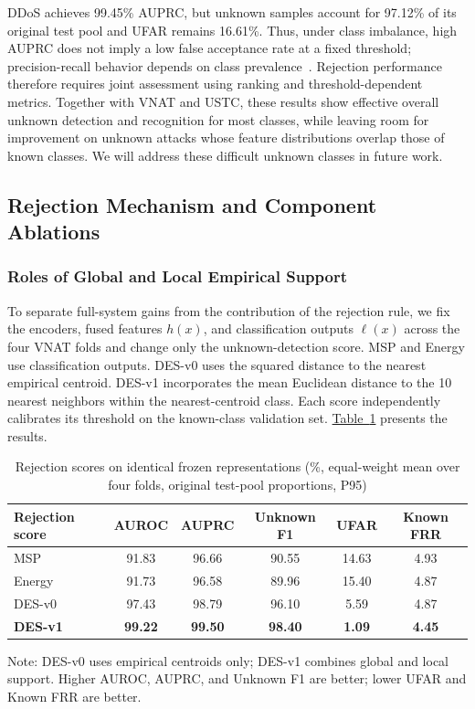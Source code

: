 DDoS achieves 99.45\% AUPRC, but unknown samples account for 97.12\% of its original test pool and UFAR remains 16.61\%. Thus, under class imbalance, high AUPRC does not imply a low false acceptance rate at a fixed threshold; precision-recall behavior depends on class prevalence~. Rejection performance therefore requires joint assessment using ranking and threshold-dependent metrics. Together with VNAT and USTC, these results show effective overall unknown detection and recognition for most classes, while leaving room for improvement on unknown attacks whose feature distributions overlap those of known classes. We will address these difficult unknown classes in future work.

\subsection{Rejection Mechanism and Component Ablations}\label{sec:rejection-ablations}
\subsubsection{Roles of Global and Local Empirical Support}
To separate full-system gains from the contribution of the rejection rule, we fix the encoders, fused features $h(x)$, and classification outputs $\ell(x)$ across the four VNAT folds and change only the unknown-detection score. MSP and Energy use classification outputs. DES-v0 uses the squared distance to the nearest empirical centroid. DES-v1 incorporates the mean Euclidean distance to the 10 nearest neighbors within the nearest-centroid class. Each score independently calibrates its threshold on the known-class validation set. \hyperref[tab:source-8]{Table~\ref*{tab:source-8}} presents the results.


\begin{table}[H]
\centering
\begingroup
\renewcommand{\thetable}{4-9}
\caption{Rejection scores on identical frozen representations (\%, equal-weight mean over four folds, original test-pool proportions, P95)}\label{tab:source-8}
\fontsize{8}{9.5}\selectfont
\setlength{\tabcolsep}{1pt}
\begin{tabular*}{\columnwidth}{@{\extracolsep{\fill}}lccccc@{}}
\hline
Rejection score & AUROC & AUPRC & Unknown F1 & UFAR & Known FRR \\
\hline
MSP & 91.83 & 96.66 & 90.55 & 14.63 & 4.93 \\
Energy & 91.73 & 96.58 & 89.96 & 15.40 & 4.87 \\
DES-v0 & 97.43 & 98.79 & 96.10 & 5.59 & 4.87 \\
\textbf{DES-v1} & \textbf{99.22} & \textbf{99.50} & \textbf{98.40} & \textbf{1.09} & \textbf{4.45} \\
\hline
\end{tabular*}
\par\smallskip\parbox{\columnwidth}{\fontsize{7}{8}\selectfont Note: DES-v0 uses empirical centroids only; DES-v1 combines global and local support. Higher AUROC, AUPRC, and Unknown F1 are better; lower UFAR and Known FRR are better.}
\endgroup
\end{table}


